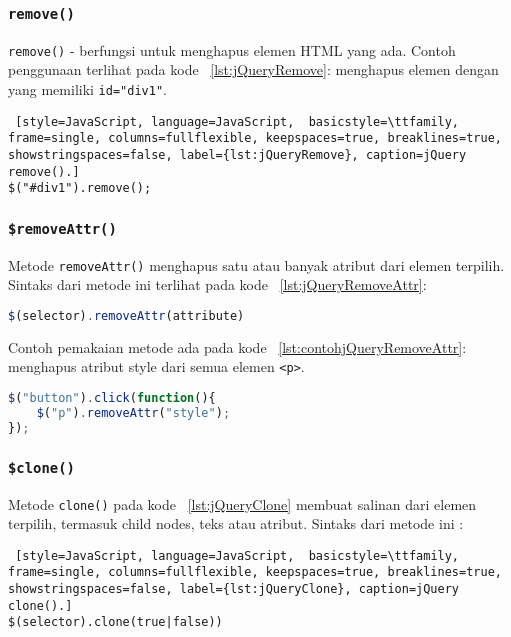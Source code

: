 \subsubsection{\texttt{remove()}}
\texttt{remove()} - berfungsi untuk menghapus elemen HTML yang ada. Contoh penggunaan terlihat pada kode ~\ref{lst:jQueryRemove}: menghapus elemen dengan yang memiliki \texttt{id="div1"}.
\begin{lstlisting} [style=JavaScript, language=JavaScript,  basicstyle=\ttfamily, frame=single, columns=fullflexible, keepspaces=true, breaklines=true, showstringspaces=false, label={lst:jQueryRemove}, caption=jQuery remove().]
$("#div1").remove();
\end{lstlisting}

\subsubsection{\texttt{\$removeAttr()}}
Metode \texttt{removeAttr()} menghapus satu atau banyak atribut dari elemen terpilih.
Sintaks dari metode ini terlihat pada kode ~\ref{lst:jQueryRemoveAttr}:
\begin{lstlisting}[style=JavaScript, language=JavaScript,  basicstyle=\ttfamily, frame=single, columns=fullflexible, keepspaces=true, breaklines=true, showstringspaces=false, label={lst:jQueryRemoveAttr}, caption=jQuery removeAttr().]
$(selector).removeAttr(attribute)
\end{lstlisting}

\noindent Contoh pemakaian metode ada pada kode ~\ref{lst:contohjQueryRemoveAttr}: menghapus atribut style dari semua elemen \texttt{<p>}.
\begin{lstlisting}[style=JavaScript, language=JavaScript,  basicstyle=\ttfamily, frame=single, columns=fullflexible, keepspaces=true, breaklines=true, showstringspaces=false, label={lst:contohjQueryRemoveAttr}, caption=contoh jQuery removeAttr().]
$("button").click(function(){
	$("p").removeAttr("style");
});
\end{lstlisting}

\subsubsection{\texttt{\$clone()}}
Metode \texttt{clone()} pada kode ~\ref{lst:jQueryClone} membuat salinan dari elemen terpilih, termasuk child nodes, teks atau atribut.
Sintaks dari metode ini :
\begin{lstlisting} [style=JavaScript, language=JavaScript,  basicstyle=\ttfamily, frame=single, columns=fullflexible, keepspaces=true, breaklines=true, showstringspaces=false, label={lst:jQueryClone}, caption=jQuery clone().]
$(selector).clone(true|false))
\end{lstlisting}

